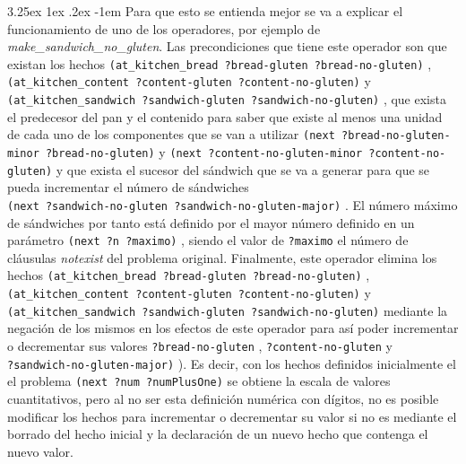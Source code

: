 \documentclass{article}
\makeatletter
\newcommand{\cool}[1] {
        {\texttt{#1}}
    }
\renewcommand\paragraph{\@startsection{paragraph}{5}{\z@}%
      {3.25ex \@plus1ex \@minus.2ex}%
      {-1em}%
      {\normalfont\normalsize\bfseries}}
\makeatother
\begin{document}
    \paragraph{}
    Para que esto se entienda mejor se va a explicar el funcionamiento de uno de los operadores, por ejemplo de \textit{make\_sandwich\_no\_gluten}. Las precondiciones que tiene este operador son que existan los hechos \cool{(at\_kitchen\_bread ?bread-gluten ?bread-no-gluten)}, \\ \cool{(at\_kitchen\_content ?content-gluten ?content-no-gluten)} y \\ \cool{(at\_kitchen\_sandwich ?sandwich-gluten ?sandwich-no-gluten)}, que exista el predecesor del pan y el contenido para saber que existe al menos una unidad de cada uno de los componentes que se van a utilizar \cool{(next ?bread-no-gluten-minor ?bread-no-gluten)} y \cool{(next ?content-no-gluten-minor ?content-no-gluten)} y que exista el sucesor del sándwich que se va a generar para que se pueda incrementar el número de sándwiches \\ \cool{(next ?sandwich-no-gluten ?sandwich-no-gluten-major)}. El número máximo de sándwiches por tanto está definido por el mayor número definido en un parámetro \cool{(next ?n ?maximo)}, siendo el valor de \cool{?maximo} el número de cláusulas \textit{notexist} del problema original. Finalmente, este operador elimina los hechos \cool{(at\_kitchen\_bread ?bread-gluten ?bread-no-gluten)}, \\ \cool{(at\_kitchen\_content ?content-gluten ?content-no-gluten)} y \\ \cool{(at\_kitchen\_sandwich ?sandwich-gluten ?sandwich-no-gluten)} mediante la negación de los mismos en los efectos de este operador para así poder incrementar o decrementar sus valores \cool{?bread-no-gluten}, \cool{?content-no-gluten} y \\ \cool{?sandwich-no-gluten-major)}). Es decir, con los hechos definidos inicialmente el el problema \cool{(next ?num ?numPlusOne)} se obtiene la escala de valores cuantitativos, pero al no ser esta definición numérica con dígitos, no es posible modificar los hechos para incrementar o decrementar su valor si no es mediante el borrado del hecho inicial y la declaración de un nuevo hecho que contenga el nuevo valor. 
    
\end{document}
